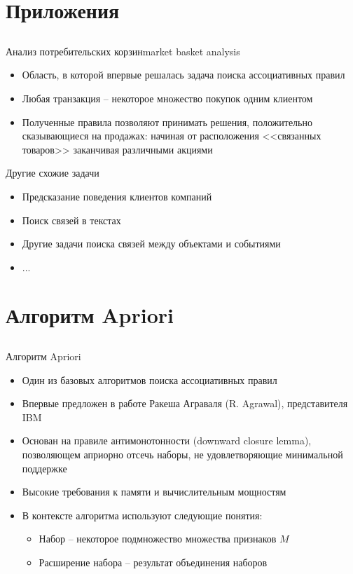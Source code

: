 \documentclass[compress,red]{beamer}
\begin{document}
\section{Приложения}
\subsection{}
\begin{frame}{Анализ потребительских корзин}{market basket analysis}
\begin{itemize}
	\item Область, в которой впервые решалась задача поиска ассоциативных правил
	\item Любая транзакция -- некоторое множество покупок одним клиентом 
	\item Полученные правила позволяют принимать решения, положительно сказывающиеся на продажах: начиная от расположения <<связанных товаров>> заканчивая различными акциями
\end{itemize}
\end{frame}

\begin{frame}{Другие схожие задачи}{}
\begin{itemize}
	\item Предсказание поведения клиентов компаний
	\item Поиск связей в текстах 
	\item Другие задачи поиска связей между объектами и событиями
	\item ...
\end{itemize}
\end{frame}


\section{Алгоритм Apriori}
\subsection{}

\begin{frame}{Алгоритм Apriori}
\begin{itemize}
\item Один из базовых алгоритмов поиска ассоциативных правил
\item Впервые предложен в работе Ракеша Аграваля (R. Agrawal), представителя IBM
\item Основан на правиле антимонотонности (downward closure lemma), позволяющем априорно отсечь наборы, не удовлетворяющие минимальной поддержке
\item Высокие требования к памяти и вычислительным мощностям
\item В контексте алгоритма используют следующие понятия:
\begin{itemize}
\item Набор -- некоторое подмножество множества признаков $M$
\item Расширение набора -- результат объединения наборов
\end{itemize}
\end{itemize}
\end{frame}
\end{document}
